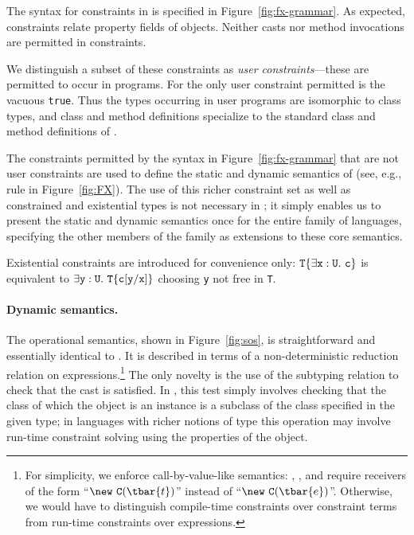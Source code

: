 The syntax for constraints in \FXZ{} is specified in
Figure~\ref{fig:fx-grammar}. As expected, constraints
relate property fields of objects. Neither casts
nor method invocations are permitted in constraints.

We distinguish a subset of these constraints as
{\em user constraints}---these are permitted to occur in
programs. For \FXZ{} the only user constraint permitted is the vacuous
{\tt true}. Thus the types occurring in user programs are isomorphic
to class types, and class and method definitions specialize to the
standard class and method definitions of \FJ{}. 

The constraints permitted by the syntax in
Figure~\ref{fig:fx-grammar} that
are not user constraints are used to define the static and
dynamic semantics of \FXZ{} (see, e.g., rule \TField{} in Figure~\ref{fig:FX}).
The use of this richer constraint set as well as constrained and existential types is
not necessary in \FXZ; it simply enables us to present the static and dynamic
semantics once for the entire family of \FX{} languages,
specifying the other members of the family as extensions
to these core semantics.

Existential constraints are introduced for convenience only:
${\tt T}\{\exists {\tt x}:{\tt U}.~{\tt c}\}$ is equivalent to $\exists {\tt y}:{\tt U}.~{\tt T}\{{\tt c}[{\tt y}/{\tt x}]\}$ choosing {\tt y} not free in {\tt T}.

\paragraph{Dynamic semantics.}
The operational semantics, shown in Figure~\ref{fig:sos},
is straightforward and essentially identical
to \FJ \cite{FJ}. It is described in terms of a non-deterministic
reduction relation on expressions.\footnote{
For simplicity, we enforce call-by-value-like semantics:
\RField, \RInvk, and \RCast{} require receivers of the form
``$\new~{\tt C}(\tbar{t})$'' instead of ``$\new~{\tt C}(\tbar{e})$''.
Otherwise, we would have to distinguish compile-time constraints over constraint terms from run-time constraints over expressions.}
The only novelty is the use of the
subtyping relation to check that the cast is satisfied. In \FXZ, this
test simply involves checking that the class of which the object is an
instance is a subclass of the class specified in the given type; in
languages with richer notions of type this operation may
involve run-time constraint solving using the properties of the object.

